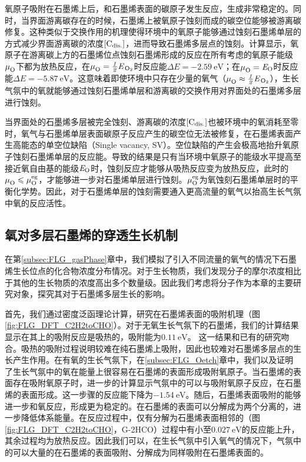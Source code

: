 氧原子吸附在石墨烯上后，和石墨烯表面的碳原子发生反应，生成非常稳定的。同时，当界面游离碳存在的时候，石墨烯上被氧原子蚀刻而成的碳空位能够被游离碳修复。这种类似于交换作用的机理使得环境中的氧原子能够通过蚀刻石墨烯单层的方式减少界面游离碳的浓度$\rm{\left[C_{dis.}\right]} \it$，进而导致石墨烯多层点的蚀刻。计算显示，氧原子在游离碳上方的石墨烯位点蚀刻石墨烯形成的反应在所有考虑的氧原子能级$\it \mu_{\rm O}^{\rm } \it$下都为放热反应，在$\muO{}=\halfEOm$时反应能$\Delta E=\SI{-2.59}{\electronvolt}$；在$\it \mu_{\rm O}^{\rm } \it=\it E_{\rm O} \it$时反应能$\Delta E=\SI{-5.87}{\electronvolt}$。这意味着即使环境中只存在少量的氧气（$\muO{} \approx \halfEOm$），生长气氛中的氧就能够通过蚀刻石墨烯单层和游离碳的交换作用对界面处的石墨烯多层进行蚀刻。

当界面处的石墨烯多层被完全蚀刻、游离碳的浓度$\rm{\left[C_{dis.}\right]} \it$也被环境中的氧消耗至零时，氧气与石墨烯单层表面碳原子反应产生的碳空位无法被修复，在石墨烯表面产生高能态的单空位缺陷（Single vacancy, SV）。空位缺陷的产生会极高地抬升氧原子蚀刻石墨烯单层的反应能。导致的结果是只有当环境中氧原子的能级水平提高至接近氧自由基的能级$\it E_{\rm O} \it$时，蚀刻反应才能够从吸热反应变为放热反应，此时的$\it \mu_{\rm O}^{\rm } \it \leqslant  \it \mu_{\rm O}^{\rm eg} \it  $，才能够进一步对石墨烯单层进行蚀刻。$\it \mu_{\rm O}^{\rm eg} \it$为氧蚀刻石墨烯单层时的平衡化学势。因此，对于石墨烯单层的蚀刻需要通入更高流量的氧气以抬高生长气氛中氧的反应活性。

\subsection{氧对多层石墨烯的穿透生长机制}
\label{subsec:Opene}
在第\ref{subsec:FLG_gasPhase}章中，我们模拟了引入不同流量的氧气的情况下石墨烯生长位点的化合物浓度分布情况。对于生长物质，我们发现分子的摩尔浓度相比于其他的生长物质的浓度高出多个数量级。因此我们考虑将分子作为本章的主要研究对象，探究其对于石墨烯多层生长的影响。

首先，我们通过密度泛函理论计算，研究在石墨烯表面的吸附机理（图\ref{fig:FLG_DFT_C2H2toCHO}）。对于无氧生长气氛下的石墨烯，我们的计算结果显示在其上的吸附反应是吸热的，吸附能为$\SI{0.11}{\electronvolt}$。
这一结果和已有的研究吻合。吸热的吸附过程说明较难在纯石墨烯上吸附，因此也较难对石墨烯多层点的生长产生作用。在有氧的生长气氛下，在\ref{subsec:FLG_Oetch}章中，我们以及证明了生长气氛中的氧在能量上很容易在石墨烯的表面形成吸附氧原子。当石墨烯的表面存在吸附氧原子时，进一步的计算显示气氛中的可以与吸附氧原子反应，在石墨烯的表面形成。这一步骤的反应能下降为$\SI{-1.54}{\electronvolt}$。随后，石墨烯表面吸附的能够进一步和氧反应，形成更为稳定的。在石墨烯的表面可以分解成为两个分离的，进一步降低体系能量。在反应过程中，仅有分解为石墨烯表面相邻的（图\ref{fig:FLG_DFT_C2H2toCHO}，G-2HCO）过程中有小至$\SI{0.027}{\electronvolt}$的反应能上升，其余过程均为放热反应。因此我们可以，在生长气氛中引入氧气的情况下，气氛中的可以大量的在石墨烯的表面吸附、分解成为同样吸附在石墨烯表面的。

